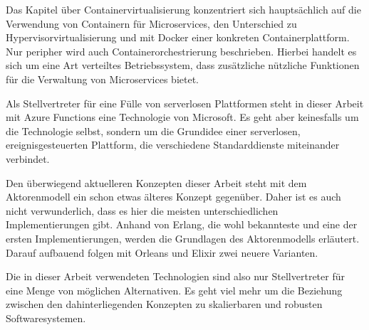 Das Kapitel über Containervirtualisierung konzentriert sich hauptsächlich auf die Verwendung von Containern für Microservices, den Unterschied zu Hypervisorvirtualisierung und mit Docker einer konkreten Containerplattform. Nur peripher wird auch Containerorchestrierung beschrieben. Hierbei handelt es sich um eine Art verteiltes Betriebssystem, dass zusätzliche nützliche Funktionen für die Verwaltung von Microservices bietet.

Als Stellvertreter für eine Fülle von serverlosen Plattformen steht in dieser Arbeit mit Azure Functions eine Technologie von Microsoft. Es geht aber keinesfalls um die Technologie selbst, sondern um die Grundidee einer serverlosen, ereignisgesteuerten Plattform, die verschiedene Standarddienste miteinander verbindet.

Den überwiegend aktuelleren Konzepten dieser Arbeit steht mit dem Aktorenmodell ein schon etwas älteres Konzept gegenüber. Daher ist es auch nicht verwunderlich, dass es hier die meisten unterschiedlichen Implementierungen gibt. Anhand von Erlang, die wohl bekannteste und eine der ersten Implementierungen, werden die Grundlagen des Aktorenmodells erläutert. Darauf aufbauend folgen mit Orleans und Elixir zwei neuere Varianten.

Die in dieser Arbeit verwendeten Technologien sind also nur Stellvertreter für eine Menge von möglichen Alternativen. Es geht viel mehr um die Beziehung zwischen den dahinterliegenden Konzepten zu skalierbaren und robusten Softwaresystemen.